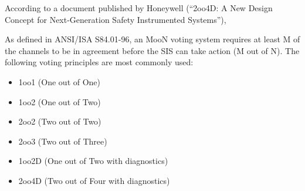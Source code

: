 According to a document published by Honeywell (``2oo4D: A New Design Concept for Next-Generation Safety Instrumented Systems''),

\vskip 10pt {\narrower \noindent \baselineskip5pt

\noindent
As defined in ANSI/ISA S84.01-96, an MooN voting system requires at least M of the channels to be in agreement before the SIS can take action (M out of N).  The following voting principles are most commonly used:

\begin{itemize}
\item{} 1oo1 (One out of One)
\item{} 1oo2 (One out of Two)
\item{} 2oo2 (Two out of Two)
\item{} 2oo3 (Two out of Three) 
\item{} 1oo2D (One out of Two with diagnostics)
\item{} 2oo4D (Two out of Four with diagnostics)
\end{itemize}

\par} \vskip 10pt











